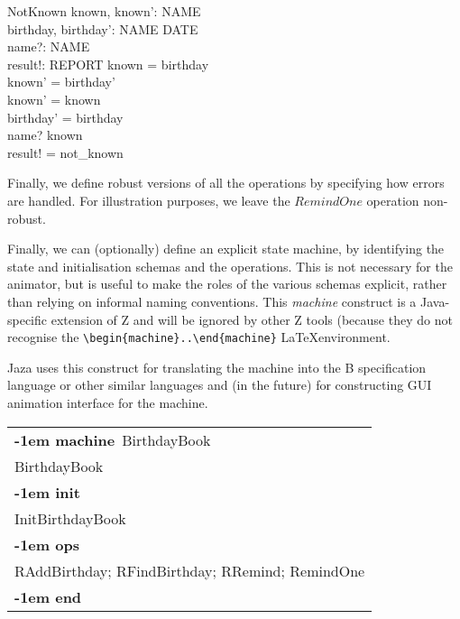 \documentclass{article}
\makeatletter
\newenvironment{machine}[1]{
    \begin{tabular}{@{\qquad}l}\textbf{\kern-1em machine}\ #1\\ }{
    \\ \textbf{\kern-1em end} \end{tabular} }
\newcommand{\machineInit}{\\ \textbf{\kern-1em init} \\}
\newcommand{\machineOps}{\\ \textbf{\kern-1em ops} \\}
\makeatother
\begin{document}
\begin{schema}{NotKnown}
    known, known': \power NAME \\
    birthday, birthday': NAME \pfun DATE \\
    name?: NAME \\
    result!: REPORT
\where
    known = \dom birthday \\
    known' = \dom birthday' \\
    known' = known \\
    birthday' = birthday \\
    name? \notin known \\
    result! = not\_known
\end{schema}

Finally, we define robust versions of all the operations
by specifying how errors are handled.  
For illustration purposes, we leave the $RemindOne$ operation non-robust.


Finally, we can (optionally) define an explicit state machine,
by identifying the state and initialisation schemas and the
operations.  This is not necessary for the animator, but is
useful to make the roles of the various schemas explicit, rather
than relying on informal naming conventions.  
This \emph{machine} construct is a Java-specific extension of Z
and will be ignored by other Z tools (because they do not
recognise the \verb!\begin{machine}..\end{machine}! \LaTeX environment.

Jaza uses this construct for translating the machine into the B
specification language or other similar languages and (in the future) for
constructing GUI animation interface for the machine.


\begin{machine}{BirthdayBook}
  BirthdayBook
\machineInit
  InitBirthdayBook
\machineOps
    RAddBirthday; 
    RFindBirthday;
    RRemind;
    RemindOne
\end{machine}
\end{document}
